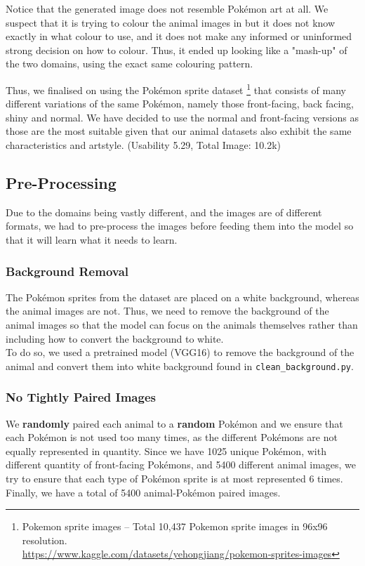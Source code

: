 \documentclass[twoside,english,notitlepage]{report}
\begin{document}
\noindent Notice that the generated image does not resemble Pokémon art at all. We suspect that it is trying to colour the animal images in but it does not know exactly in what colour to use, and it does not make any informed or uninformed strong decision on how to colour. Thus, it ended up looking like a "mash-up" of the two domains, using the exact same colouring pattern. 

\noindent Thus, we finalised on using the Pokémon sprite dataset \footnote{Pokemon sprite images – Total 10,437 Pokemon sprite images in 96x96 resolution. \\ \href{https://www.kaggle.com/datasets/yehongjiang/pokemon-sprites-images}{https://www.kaggle.com/datasets/yehongjiang/pokemon-sprites-images}} that consists of many different variations of the same Pokémon, namely those front-facing, back facing, shiny and normal. We have decided to use the normal and front-facing versions as those are the most suitable given that our animal datasets also exhibit the same characteristics and artstyle. (Usability 5.29, Total Image: 10.2k)

\newpage
\subsection{Pre-Processing}\label{task2:preprocess}
Due to the domains being vastly different, and the images are of different formats, we had to pre-process the images before feeding them into the model so that it will learn what it needs to learn. 
\subsubsection{Background Removal}
The Pokémon sprites from the dataset are placed on a white background, whereas the animal images are not. Thus, we need to remove the background of the animal images so that the model can focus on the animals themselves rather than including how to convert the background to white. \\

\noindent To do so, we used a pretrained model (VGG16) to remove the background of the animal and convert them into white background found in \verb|clean_background.py|.

\subsubsection{No Tightly Paired Images}
We \textbf{randomly} paired each animal to a \textbf{random} Pokémon and we ensure that each Pokémon is not used too many times, as the different Pokémons are not equally represented in quantity. Since we have 1025 unique Pokémon, with different quantity of front-facing Pokémons, and 5400 different animal images, we try to ensure that each type of Pokémon sprite is at most represented 6 times. Finally, we have a total of 5400 animal-Pokémon paired images. 
\end{document}

